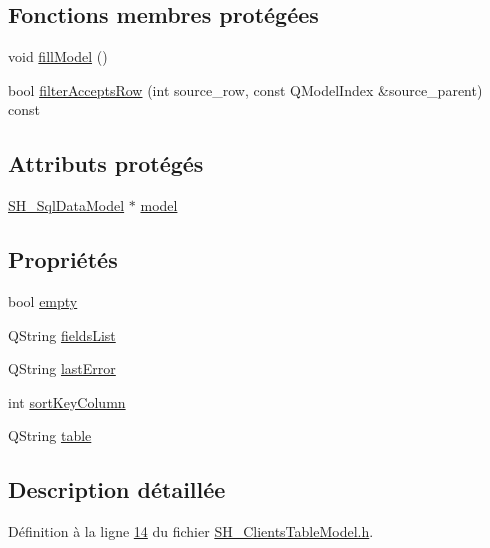 \subsection*{Fonctions membres protégées}
\begin{DoxyCompactItemize}
\item 
void \hyperlink{classSH__ClientsTableModel_acdce7cce4737b66016078011cffdaa31}{fill\-Model} ()
\item 
bool \hyperlink{classSH__ExtendedProxyModel_a1eda169699702a7bfed4dfa8718c0b86}{filter\-Accepts\-Row} (int source\-\_\-row, const Q\-Model\-Index \&source\-\_\-parent) const 
\end{DoxyCompactItemize}
\subsection*{Attributs protégés}
\begin{DoxyCompactItemize}
\item 
\hyperlink{classSH__SqlDataModel}{S\-H\-\_\-\-Sql\-Data\-Model} $\ast$ \hyperlink{classSH__ExtendedProxyModel_a8c8b8930c6b1abd9bbb1dce1fdc9690b}{model}
\end{DoxyCompactItemize}
\subsection*{Propriétés}
\begin{DoxyCompactItemize}
\item 
bool \hyperlink{classSH__ExtendedProxyModel_a9e22d17af7776aca8052084cc33c3442}{empty}
\item 
Q\-String \hyperlink{classSH__ExtendedProxyModel_a15e779ba92384a57442d6bd79ef3d1d1}{fields\-List}
\item 
Q\-String \hyperlink{classSH__ExtendedProxyModel_a287d34971582bbe68a7f1f0826165de5}{last\-Error}
\item 
int \hyperlink{classSH__ExtendedProxyModel_a47e2d0b99b84fb066438db667dd1ad26}{sort\-Key\-Column}
\item 
Q\-String \hyperlink{classSH__ExtendedProxyModel_a7eef4557a77444e9ce5c24c180392bfa}{table}
\end{DoxyCompactItemize}


\subsection{Description détaillée}


Définition à la ligne \hyperlink{SH__ClientsTableModel_8h_source_l00014}{14} du fichier \hyperlink{SH__ClientsTableModel_8h_source}{S\-H\-\_\-\-Clients\-Table\-Model.\-h}.



